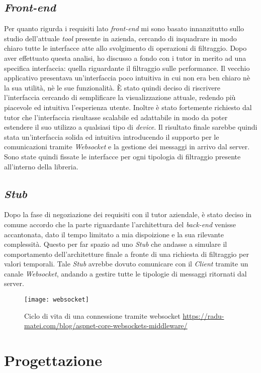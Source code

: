 \subsection{\textit{Front-end}}
Per quanto rigurda i requisiti lato \textit{front-end} mi sono basato innanzitutto sullo studio dell'attuale \textit{tool} presente in azienda, cercando di inquadrare in modo chiaro tutte le interfacce atte allo svolgimento di operazioni di filtraggio. Dopo aver effettuato questa analisi, ho discusso a fondo con i tutor in merito ad una specifica interfaccia: quella riguardante il filtraggio sulle performance. Il vecchio applicativo presentava un'interfaccia poco intuitiva in cui non era ben chiaro nè la sua utilità, nè le sue funzionalità. È stato quindi deciso di riscrivere l'interfaccia cercando di semplificare la visualizzazione attuale, redendo più piacevole ed intuitiva l'esperienza utente. Inoltre è stato fortemente richiesto dal tutor che l'interfaccia risultasse scalabile ed adattabile in modo da poter estendere il suo utilizzo a qualsiasi tipo di \textit{device}. Il risultato finale sarebbe quindi stata un'interfaccia solida ed intuitiva introducendo il supporto per le comunicazioni tramite \textit{\gls{Websocket}} e la gestione dei messaggi in arrivo dal server. Sono state quindi fissate le interfacce per ogni tipologia di filtraggio presente all'interno della libreria.

\subsection{\textit{Stub}}
Dopo la fase di negoziazione dei requisiti con il tutor aziendale, è stato deciso in comune accordo che la parte riguardante l'architettura del \textit{back-end} venisse accantonata, dato il tempo limitato a mia dispoizione e la sua rilevante complessità. Questo per far spazio ad uno \textit{Stub} che andasse a simulare il comportamento dell'architetture finale a fronte di una richiesta di filtraggio per valori temporali. Tale \textit{Stub} avrebbe dovuto comunicare con il \textit{Client} tramite un canale \textit{Websocket}, andando a gestire tutte le tipologie di messaggi ritornati dal server.
\begin{figure}[!h] 
	\centering 
	\texttt{[image: websocket]} 
	\caption{Ciclo di vita di una connessione tramite websocket \url{https://radu-matei.com/blog/aspnet-core-websockets-middleware/}}
\end{figure}
\newpage
\section{Progettazione}
